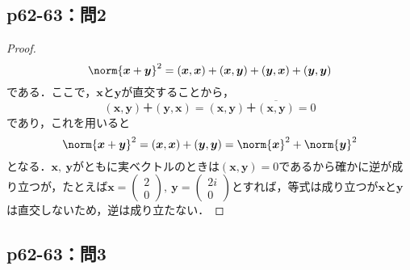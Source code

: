 \documentclass[uplatex,dvipdfmx,a4paper,10pt,fleqn]{jsarticle}
\begin{document}
\subsection*{p62-63：問2}
\begin{tleftbar}
    \begin{proof}
        \[
        \norm{\bm{x}+\bm{y}}^2=(\bm{x},\bm{x})+(\bm{x},\bm{y})+(\bm{y},\bm{x})+(\bm{y},\bm{y})
        \]
        である．ここで，$\bm{x}$と$\bm{y}$が直交することから，
        \[
            (\bm{x},\bm{y})＋(\bm{y},\bm{x})=(\bm{x},\bm{y})＋\overline{(\bm{x},\bm{y})}=0
            \]
            であり，これを用いると
        \[
            \norm{\bm{x}+\bm{y}}^2 =(\bm{x},\bm{x})+(\bm{y},\bm{y})=\norm{\bm{x}}^2 +\norm{\bm{y}}^2
        \]
        となる．$\bm{x},~\bm{y}$がともに実ベクトルのときは$(\bm{x},\bm{y})=0$であるから確かに逆が成り立つが，たとえば$\bm{x}=
        \begin{pmatrix}
            2 \\
            0
        \end{pmatrix}
        ,~
        \bm{y}=
        \begin{pmatrix}
            2i \\
            0
        \end{pmatrix}
        $とすれば，等式は成り立つが$\bm{x}$と$\bm{y}$は直交しないため，逆は成り立たない．
    \end{proof}
\end{tleftbar}

\subsection*{p62-63：問3}
\end{document}
